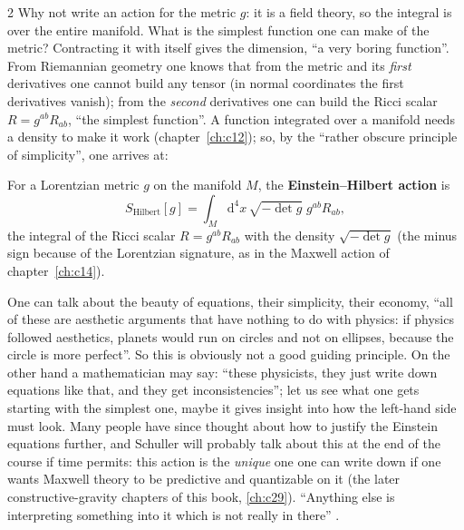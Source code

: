 \begin{paracol}{2}
Why not write an action for the metric $g$: it is a field theory, so the integral is over the entire manifold. What is the simplest function one can make of the metric? Contracting it with itself gives the dimension, ``a very boring function''. From Riemannian geometry one knows that from the metric and its \emph{first} derivatives one cannot build any tensor (in normal coordinates the first derivatives vanish); from the \emph{second} derivatives one can build the Ricci scalar $R=g^{ab}R_{ab}$, ``the simplest function''. A function integrated over a manifold needs a density to make it work (chapter~\ref{ch:c12}); so, by the ``rather obscure principle of simplicity'', one arrives at:

\begin{definition}\label{def:c15-eh}
For a Lorentzian metric $g$ on the manifold $M$, the \textbf{Einstein--Hilbert action} is
\[
  S_{\mathrm{Hilbert}}[g]=\int_M\mathrm d^4x\,\sqrt{-\det g}\;g^{ab}R_{ab},
\]
the integral of the Ricci scalar $R=g^{ab}R_{ab}$ with the density $\sqrt{-\det g}$ (the minus sign because of the Lorentzian signature, as in the Maxwell action of chapter~\ref{ch:c14}).
\end{definition}
\begin{coursenote}
One can talk about the beauty of equations, their simplicity, their economy, ``all of these are aesthetic arguments that have nothing to do with physics: if physics followed aesthetics, planets would run on circles and not on ellipses, because the circle is more perfect''. So this is obviously not a good guiding principle. On the other hand a mathematician may say: ``these physicists, they just write down equations like that, and they get inconsistencies''; let us see what one gets starting with the simplest one, maybe it gives insight into how the left-hand side must look. Many people have since thought about how to justify the Einstein equations further, and Schuller will probably talk about this at the end of the course if time permits: this action is the \emph{unique} one one can write down if one wants Maxwell theory to be predictive and quantizable on it (the later constructive-gravity chapters of this book, \cref{ch:c29}). ``Anything else is interpreting something into it which is not really in there'' .
\end{coursenote}


\end{paracol}
